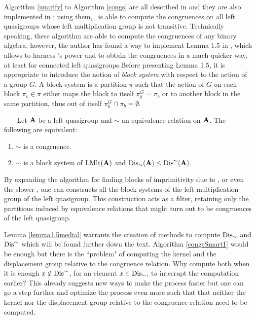 \noindent Algorithm \ref{unarify} to Algorithm \ref{congs} are all described in \cite{Araujo2022CREAMAP} and they are also implemented in \Software; using them, \Software~is able to compute the congruences on all left quasigroups whose left multiplication group is not transitive. \newline
Technically speaking, these algorithm are able to compute the congruences of any binary algebra; however, the author has found a way to implement Lemma 1.5 in \cite{bonatto2022medial}, which allows to harness \magma's power and to obtain the congruences in a much quicker way, at least for connected left quasigroups.\newline\newpage\noindent Before presenting Lemma 1.5, it is appropriate to introduce the notion of \emph{block system} with respect to the action of a group $G$. A block system is a partition $\pi$ such that the action of $G$ on each block $\pi_b\in \pi$ either maps the block to itself $\pi_b^G = \pi_b$ or to another block in the same partition, thus out of itself $\pi_b^G \cap \pi_b = \emptyset$.

\begin{lemma}\textcolor{white}{line}\newline\label{lemma1.5medial}
Let $\mathbf{A}$ be a left quasigroup and $\sim$ an equivalence relation on $\mathbf{A}$. The following are equivalent:
\begin{enumerate}
    \item $\sim$ is a congruence.
    \item $\sim$ is a block system of $\operatorname{LMlt}(\mathbf{A})$ and  $\operatorname{Dis}_{\sim}(\mathbf{A})\leq \operatorname{Dis}^{\sim}(\mathbf{A})$.
\end{enumerate}
\end{lemma}

\noindent By expanding the algorithm for finding blocks of imprimitivity due to \cite{schonert1994finding, seress_2003}, or even the slower \cite{atkinson}, one can constructs all the block systems of the left multiplication group of the left quasigroup. This construction acts as a filter, retaining only the partitions induced by equivalence relations that might turn out to be congruences of the left quasigroup. 

\noindent Lemma \ref{lemma1.5medial} warrants the creation of methods to compute $\operatorname{Dis}_\sim$ and $\operatorname{Dis}^\sim$ which will be found further down the text. \newline\newline
\noindent Algorithm \ref{congsSmart1} would be enough but there is the ``problem" of computing the kernel and the displacement group relative to the congruence relation. Why compute both when it is enough $x\notin \operatorname{Dis}^\sim$, for an element $x\in \operatorname{Dis}_\sim$, to interrupt the computation earlier? This already suggests new ways to make the process faster but one can go a step further and optimize the process even more such that that neither the kernel nor the displacement group relative to the congruence relation need to be computed.\newline\newline

